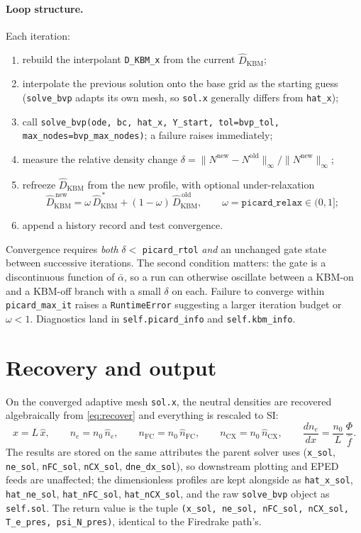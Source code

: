 \documentclass[11pt]{article}
\newcommand{\hn}{\hat{n}}
\newcommand{\hx}{\hat{x}}
\newcommand{\hD}{\hat{D}}
\newcommand{\hf}{\hat{f}}
\newcommand{\code}[1]{\texttt{#1}}
\begin{document}
\paragraph{Loop structure.}
Each iteration:
\begin{enumerate}
  \item rebuild the interpolant \code{D\_KBM\_x} from the current
        $\hD_{\mathrm{KBM}}$;
  \item interpolate the previous solution onto the base grid as the
        starting guess (\code{solve\_bvp} adapts its own mesh, so
        \code{sol.x} generally differs from \code{hat\_x});
  \item call \code{solve\_bvp(ode, bc, hat\_x, Y\_start, tol=bvp\_tol,
        max\_nodes=bvp\_max\_nodes)}; a failure raises immediately;
  \item measure the relative density change
        $\delta = \|N^{\mathrm{new}} - N^{\mathrm{old}}\|_\infty /
        \|N^{\mathrm{new}}\|_\infty$;
  \item refreeze $\hD_{\mathrm{KBM}}$ from the new profile, with optional
        under-relaxation
        \[
          \hD_{\mathrm{KBM}}^{\,\mathrm{new}}
            = \omega\,\hD_{\mathrm{KBM}}^{\,\ast}
            + (1-\omega)\,\hD_{\mathrm{KBM}}^{\,\mathrm{old}},
          \qquad \omega = \code{picard\_relax} \in (0,1];
        \]
  \item append a history record and test convergence.
\end{enumerate}
Convergence requires \emph{both} $\delta < $ \code{picard\_rtol}
\emph{and} an unchanged gate state between successive iterations.  The
second condition matters: the gate is a discontinuous function of
$\bar\alpha$, so a run can otherwise oscillate between a KBM-on and a
KBM-off branch with a small $\delta$ on each.  Failure to converge within
\code{picard\_max\_it} raises a \code{RuntimeError} suggesting a larger
iteration budget or $\omega < 1$.  Diagnostics land in
\code{self.picard\_info} and \code{self.kbm\_info}.

\section{Recovery and output}
\label{sec:output}

On the converged adaptive mesh \code{sol.x}, the neutral densities are
recovered algebraically from \eqref{eq:recover} and everything is
rescaled to SI:
\begin{equation}
  x = L\,\hx, \qquad
  n_e = n_0\,\hn_e, \qquad
  n_{\mathrm{FC}} = n_0\,\hn_{\mathrm{FC}}, \qquad
  n_{\mathrm{CX}} = n_0\,\hn_{\mathrm{CX}}, \qquad
  \frac{dn_e}{dx} = \frac{n_0}{L}\,\frac{\Phi}{\hf}.
\end{equation}
The results are stored on the same attributes the parent solver uses
(\code{x\_sol}, \code{ne\_sol}, \code{nFC\_sol}, \code{nCX\_sol},
\code{dne\_dx\_sol}), so downstream plotting and EPED feeds are
unaffected; the dimensionless profiles are kept alongside as
\code{hat\_x\_sol}, \code{hat\_ne\_sol}, \code{hat\_nFC\_sol},
\code{hat\_nCX\_sol}, and the raw \code{solve\_bvp} object as
\code{self.sol}.  The return value is the tuple
\code{(x\_sol, ne\_sol, nFC\_sol, nCX\_sol, T\_e\_pres, psi\_N\_pres)},
identical to the Firedrake path's.
\end{document}
